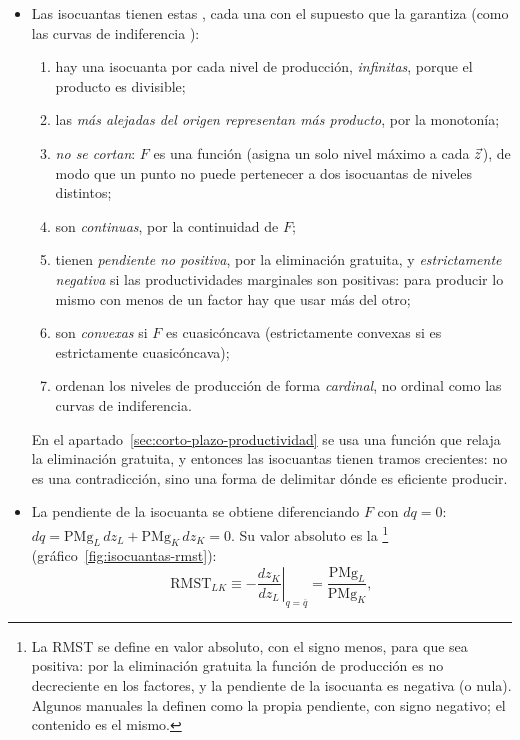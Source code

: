 \documentclass[11pt]{article}
\begin{document}
\begin{itemize}
\item Las isocuantas tienen estas , cada una con el supuesto que la garantiza (como las curvas de indiferencia ):
  \begin{enumerate}
  \item hay una isocuanta por cada nivel de producción, \emph{infinitas}, porque el producto es divisible;
  \item las \emph{más alejadas del origen representan más producto}, por la monotonía;
  \item \emph{no se cortan}: $F$ es una función (asigna un solo nivel máximo a cada $\vec{z}$), de modo que un punto no puede pertenecer a dos isocuantas de niveles distintos;
  \item son \emph{continuas}, por la continuidad de $F$;
  \item tienen \emph{pendiente no positiva}, por la eliminación gratuita, y \emph{estrictamente negativa} si las productividades marginales son positivas: para producir lo mismo con menos de un factor hay que usar más del otro;
  \item son \emph{convexas} si $F$ es cuasicóncava (estrictamente convexas si es estrictamente cuasicóncava);
  \item ordenan los niveles de producción de forma \emph{cardinal}, no ordinal como las curvas de indiferencia.
  \end{enumerate}
  En el apartado~\ref{sec:corto-plazo-productividad} se usa una función que relaja la eliminación gratuita, y entonces las isocuantas tienen tramos crecientes: no es una contradicción, sino una forma de delimitar dónde es eficiente producir.
\item La pendiente de la isocuanta se obtiene diferenciando $F$ con $dq=0$: $dq=\mathrm{PMg}_L\,dz_L+\mathrm{PMg}_K\,dz_K=0$. Su valor absoluto es la \footnote{La RMST se define en valor absoluto, con el signo menos, para que sea positiva: por la eliminación gratuita la función de producción es no decreciente en los factores, y la pendiente de la isocuanta es negativa (o nula). Algunos manuales la definen como la propia pendiente, con signo negativo; el contenido es el mismo.} (gráfico~\ref{fig:isocuantas-rmst}):
  \begin{equation}
  \mathrm{RMST}_{LK}\equiv-\left.\frac{dz_K}{dz_L}\right|_{q=\overline{q}}=\frac{\mathrm{PMg}_L}{\mathrm{PMg}_K}, \label{eq:rmst}
  \end{equation}

\end{itemize}
\end{document}
